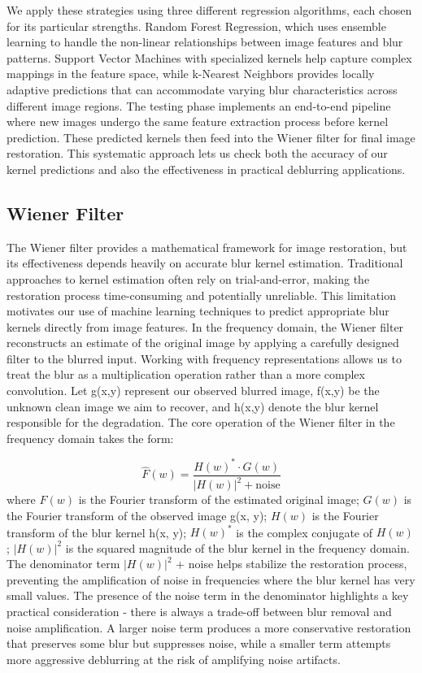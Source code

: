 \documentclass[twoside,11pt]{article}
\begin{document}
We apply these strategies using three different regression algorithms, each chosen for its particular strengths. Random Forest Regression, which uses ensemble learning to handle the non-linear relationships between image features and blur patterns. Support Vector Machines with specialized kernels help capture complex mappings in the feature space, while k-Nearest Neighbors provides locally adaptive predictions that can accommodate varying blur characteristics across different image regions.
The testing phase implements an end-to-end pipeline where new images undergo the same feature extraction process before kernel prediction. These predicted kernels then feed into the Wiener filter for final image restoration. This systematic approach lets us check both the accuracy of our kernel predictions and also the effectiveness in practical deblurring applications.

\subsection{Wiener Filter}
The Wiener filter provides a mathematical framework for image restoration, but its effectiveness depends heavily on accurate blur kernel estimation. Traditional approaches to kernel estimation often rely on trial-and-error, making the restoration process time-consuming and potentially unreliable. This limitation motivates our use of machine learning techniques to predict appropriate blur kernels directly from image features. In the frequency domain, the Wiener filter reconstructs an estimate of the original image by applying a carefully designed filter to the blurred input. Working with frequency representations allows us to treat the blur as a multiplication operation rather than a more complex convolution. Let g(x,y) represent our observed blurred image, f(x,y) be the unknown clean image we aim to recover, and h(x,y) denote the blur kernel responsible for the degradation.
The core operation of the Wiener filter in the frequency domain takes the form:

\[
\hat{F}(w) = \frac{H(w)^* \cdot G(w)}{|H(w)|^2 + \text{noise}}
\]
where \(F(w)\) is the Fourier transform of the estimated original image; \(G(w)\) is the Fourier transform of the observed image g(x, y); \(H(w)\) is the Fourier transform of the blur kernel h(x, y); \(H(w)^*\) is the complex conjugate of \(H(w)\); \(|H(w)|^2\) is the squared magnitude of the blur kernel in the frequency domain. The denominator term \(|H(w)|^2\) + noise helps stabilize the restoration process, preventing the amplification of noise in frequencies where the blur kernel has very small values.
The presence of the noise term in the denominator highlights a key practical consideration - there is always a trade-off between blur removal and noise amplification. A larger noise term produces a more conservative restoration that preserves some blur but suppresses noise, while a smaller term attempts more aggressive deblurring at the risk of amplifying noise artifacts. 
\end{document}
